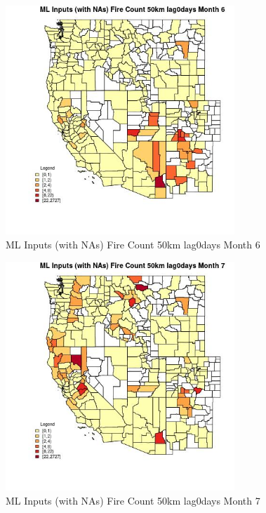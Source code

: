 \begin{figure} 
\centering  
\includegraphics[width=0.77\textwidth]{Code_Outputs/Report_ML_input_PM25_Step4_part_f_de_duplicated_aveswNAs_CountyFire_Count_50km_lag0daysmedianMonth6.jpg} 
\caption{\label{fig:Report_ML_input_PM25_Step4_part_f_de_duplicated_aveswNAsCountyFire_Count_50km_lag0daysmedianMonth6}ML Inputs (with NAs) Fire Count 50km lag0days Month 6} 
\end{figure} 
 

\begin{figure} 
\centering  
\includegraphics[width=0.77\textwidth]{Code_Outputs/Report_ML_input_PM25_Step4_part_f_de_duplicated_aveswNAs_CountyFire_Count_50km_lag0daysmedianMonth7.jpg} 
\caption{\label{fig:Report_ML_input_PM25_Step4_part_f_de_duplicated_aveswNAsCountyFire_Count_50km_lag0daysmedianMonth7}ML Inputs (with NAs) Fire Count 50km lag0days Month 7} 
\end{figure} 
 

